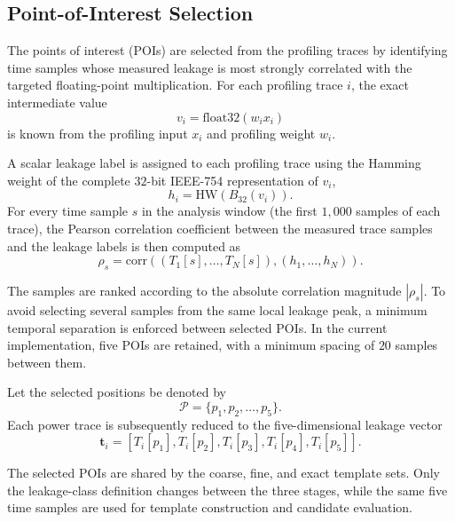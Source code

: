 \documentclass[conference]{IEEEtran}
\begin{document}
\subsection{Point-of-Interest Selection}
\label{sec:poi-selection}

The points of interest (POIs) are selected from the profiling traces by identifying time samples whose measured leakage is most strongly correlated with the targeted floating-point multiplication.
For each profiling trace $i$, the exact intermediate value
\begin{equation*}
	v_i = \mathrm{float32}(w_i x_i)
\end{equation*}
is known from the profiling input $x_i$ and profiling weight $w_i$.

A scalar leakage label is assigned to each profiling trace using the Hamming weight of the complete $32$-bit IEEE-754 representation of $v_i$,
\begin{equation*}
	h_i =
	\mathrm{HW}\left(B_{32}(v_i)\right).
\end{equation*}
For every time sample $s$ in the analysis window (the first $1{,}000$ samples of each trace), the Pearson correlation coefficient between the measured trace samples and the leakage labels is then computed as
\begin{equation*}
	\rho_s =
	\mathrm{corr}
	\left(
	\left(T_1[s],\ldots,T_N[s]\right),
	\left(h_1,\ldots,h_N\right)
	\right).
\end{equation*}

The samples are ranked according to the absolute correlation magnitude $|\rho_s|$.
To avoid selecting several samples from the same local leakage peak, a minimum temporal separation is enforced between selected POIs.
In the current implementation, five POIs are retained, with a minimum spacing of $20$ samples between them.

Let the selected positions be denoted by
\begin{equation*}
	\mathcal{P} = \{p_1,p_2,\ldots,p_5\}.
\end{equation*}
Each power trace is subsequently reduced to the five-dimensional leakage vector
\begin{equation*}
	\mathbf{t}_i =
	\left[
	T_i[p_1],
	T_i[p_2],
	T_i[p_3],
	T_i[p_4],
	T_i[p_5]
	\right].
\end{equation*}

The selected POIs are shared by the coarse, fine, and exact template sets.
Only the leakage-class definition changes between the three stages, while the same five time samples are used for template construction and candidate evaluation.
\end{document}
